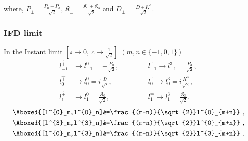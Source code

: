\documentclass[]{article}
\numberwithin{equation}{section}
\begin{document}
{{where, $P_{\pm}=\frac{P_{0}\pm P_{3}}{\sqrt{2}}$, $\mathfrak{K}_{\pm}=\frac{\mathfrak{K}_{0}\pm \mathfrak{K}_{3}}{\sqrt{2}}$ and $D_{\pm}=\frac{D\pm{K^{3}}}{\sqrt{2}}$.
\pagebreak
\subsubsection{IFD limit}
In the Instant limit $[s\longrightarrow0,~c\longrightarrow\frac{1}{\sqrt{2}}]$ $(m,n\in\{-1,0,1\})$
\begin{align}
    l^{\hat{+}}_{-1}&\longrightarrow l^{0}_{-1}=-\frac{P_{0}}{\sqrt{2}},~~~~~~~~~~~~&&l^{\hat{-}}_{-1}\longrightarrow l^{3}_{-1}= \frac{P_{3}}{\sqrt{2}},\\
    l^{\hat{+}}_{0}&\longrightarrow l^{0}_{0}=i\frac{D}{\sqrt{2}},~~~~~~~~~~~~&&l^{\hat{-}}_{0}\longrightarrow l^{3}_{0}= i\frac{K^{3}}{\sqrt{2}},\\
    l^{\hat{+}}_{1}&\longrightarrow l^{0}_{1}= \frac{\mathfrak{K}_{0}}{\sqrt{2}},~~~~~~~~~~~~&&l^{\hat{-}}_{1}\longrightarrow l^{3}_{1}= \frac{\mathfrak{K}_{3}}{\sqrt{2}}.
\end{align}
\begin{align}
    \Aboxed{[l^{0}_m,l^{0}_n]&=\frac{(m-n)}{\sqrt{2}}l^{0}_{m+n}}~,\\
    \Aboxed{[l^{3}_m,l^{3}_n]&=\frac{(m-n)}{\sqrt{2}}l^{0}_{m+n}}~,\\
    \Aboxed{[l^{0}_m,l^{3}_n]&=\frac{(m-n)}{\sqrt{2}}l^{3}_{m+n}}~.
\end{align}
\begin{table}[h!]
\centering
\caption{\label{tabelinterpolationifd}$1+1$ conformal algebra in IFD}
\end{table}


}}
\end{document}
